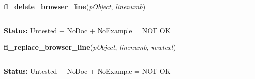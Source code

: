     \label{xformslib:library:fl_delete_browser_line}

    \vspace{0.5ex}

\hspace{.8\funcindent}\begin{boxedminipage}{\funcwidth}

    \raggedright \textbf{fl\_delete\_browser\_line}(\textit{pObject}, \textit{linenumb})

    \vspace{-1.5ex}

    \rule{\textwidth}{0.5\fboxrule}
\setlength{\parskip}{2ex}
\setlength{\parskip}{1ex}
\textbf{Status:} Untested + NoDoc + NoExample = NOT OK



    \end{boxedminipage}

    \label{xformslib:library:fl_replace_browser_line}

    \vspace{0.5ex}

\hspace{.8\funcindent}\begin{boxedminipage}{\funcwidth}

    \raggedright \textbf{fl\_replace\_browser\_line}(\textit{pObject}, \textit{linenumb}, \textit{newtext})

    \vspace{-1.5ex}

    \rule{\textwidth}{0.5\fboxrule}
\setlength{\parskip}{2ex}
\setlength{\parskip}{1ex}
\textbf{Status:} Untested + NoDoc + NoExample = NOT OK



    \end{boxedminipage}

    \label{xformslib:library:fl_get_browser_line}

    \vspace{0.5ex}

